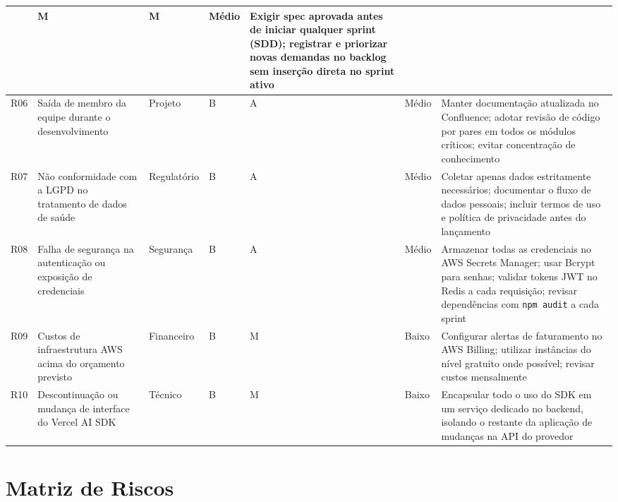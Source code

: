 \begin{table}[H]
{{\begin{tabular}{p{0.6cm}p{3.2cm}p{1.8cm}p{1cm}p{1cm}p{1.2cm}p{5cm}}
      & M & M
      & \cellcolor{warning!30} Médio
      & Exigir spec aprovada antes de iniciar
        qualquer sprint (SDD); registrar e priorizar
        novas demandas no backlog sem inserção
        direta no sprint ativo \\
    \midrule
    R06
      & Saída de membro da equipe durante o
        desenvolvimento
      & Projeto
      & B & A
      & \cellcolor{warning!30} Médio
      & Manter documentação atualizada no
        Confluence; adotar revisão de código por
        pares em todos os módulos críticos;
        evitar concentração de conhecimento \\
    \midrule
    R07
      & Não conformidade com a LGPD no
        tratamento de dados de saúde
      & Regulatório
      & B & A
      & \cellcolor{warning!30} Médio
      & Coletar apenas dados estritamente
        necessários; documentar o fluxo de dados
        pessoais; incluir termos de uso e política
        de privacidade antes do lançamento \\
    \midrule
    R08
      & Falha de segurança na autenticação
        ou exposição de credenciais
      & Segurança
      & B & A
      & \cellcolor{warning!30} Médio
      & Armazenar todas as credenciais no AWS
        Secrets Manager; usar Bcrypt para senhas;
        validar tokens JWT no Redis a cada
        requisição; revisar dependências com
        \texttt{npm audit} a cada sprint \\
    \midrule
    R09
      & Custos de infraestrutura AWS acima
        do orçamento previsto
      & Financeiro
      & B & M
      & \cellcolor{success!25} Baixo
      & Configurar alertas de faturamento no
        AWS Billing; utilizar instâncias do
        nível gratuito onde possível;
        revisar custos mensalmente \\
    \midrule
    R10
      & Descontinuação ou mudança de interface
        do Vercel AI SDK
      & Técnico
      & B & M
      & \cellcolor{success!25} Baixo
      & Encapsular todo o uso do SDK em um
        serviço dedicado no backend, isolando
        o restante da aplicação de mudanças
        na API do provedor \\
    \bottomrule
  \end{tabular}}
  }%
\end{table}

\section{Matriz de Riscos}
\label{sec:risk-matrix}

